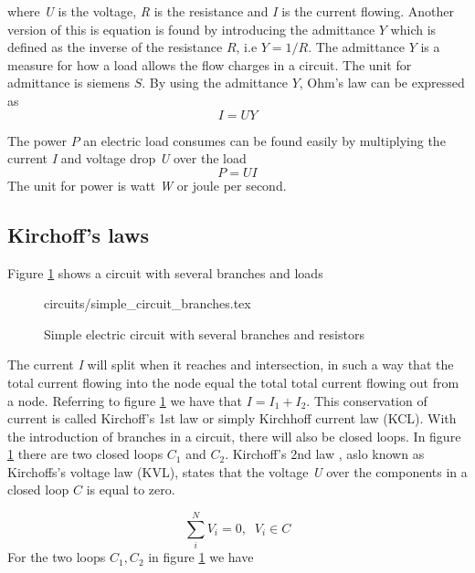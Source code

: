 \documentclass[class=book, crop=false]{standalone}
\begin{document}
where  \textit{U} is the voltage, \textit{R} is the resistance and \textit{I} is the current flowing. Another version of this is equation is found by introducing the admittance $Y$ which is defined as the inverse of the resistance $R$, i.e  $Y = 1/R$. The admittance $Y$ is a measure for how a load allows the flow charges in a circuit. The unit for admittance is siemens $S$. By using the admittance $Y$, Ohm's law can be expressed as
\begin{equation}\label{eq:theory:ohm_simple_inverse}
    I = UY
\end{equation}

The power $P$ an electric load consumes can be found easily by multiplying the current \textit{I} and voltage drop \textit{U} over the load
\begin{equation}\label{eq:theory:apparent_power}
    P = UI
\end{equation}
The unit for power is watt \textit{W} or joule per second.

\subsection{Kirchoff's laws}
Figure \ref{fig:theory:simple_circuit_branches} shows a circuit with several branches and loads 

\begin{figure}[ht!]
    \centering
    {circuits/simple_circuit_branches.tex}
    \caption{Simple electric circuit with several branches and resistors}
    \label{fig:theory:simple_circuit_branches}
\end{figure}

The current \textit{I} will split when it reaches and intersection, in such a way that the total current flowing into the node equal the total total current flowing out from a node. Referring to figure \ref{fig:theory:simple_circuit_branches} we have that $I = I_1 + I_2$. This conservation of current is called Kirchoff's 1st law or simply Kirchhoff current law (KCL). With the introduction of branches in a circuit, there will also be closed loops. In figure \ref{fig:theory:simple_circuit_branches} there are two closed loops $C_{1}$ and $C_{2}$. Kirchoff's 2nd law , aslo known as Kirchoffs's voltage law (KVL), states that the voltage \textit{U} over the components in a closed loop $C$ is equal to zero. 

\begin{equation}\label{eq:theory:kirchoffs_2nd_integral}
    \sum_{i}^{N} V_{i} = 0, \;\; V_{i} \in C
\end{equation}
For the two loops $C_1,C_2$ in figure \ref{fig:theory:simple_circuit_branches} we have 
\end{document}
